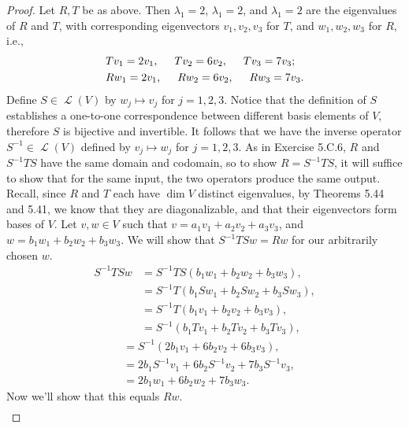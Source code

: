 \documentclass[letterpaper, 12pt]{amsart}
\DeclareMathOperator{\Ell}{\mathscr{L}}				%
\theoremstyle{definition}  							%
\begin{document}
		\begin{proof}
		Let $R,T$ be as above.
		Then $\lambda_{1} = 2$, $\lambda_{1} = 2$, and $\lambda_{1} = 2$ are the eigenvalues of $R$ and $T$, with corresponding eigenvectors $v_{1}, v_{2}, v_{3}$ for $T$, and $w_{1}, w_{2}, w_{3}$ for $R$, i.e.,
			\begin{align*}
				&Tv_{1} = 2v_{1}, \hspace{5mm} Tv_{2} = 6v_{2}, \hspace{5mm} Tv_{3} = 7v_{3}; \\
				&Rw_{1} = 2v_{1}, \hspace{5mm} Rw_{2} = 6v_{2}, \hspace{5mm} Rw_{3} = 7v_{3}.
			\end{align*}
		Define $S \in \Ell(V)$ by $w_{j} \mapsto v_{j}$ for $j = 1,2,3$.
		Notice that the definition of $S$ establishes a one-to-one correspondence between different basis elements of $V$, therefore $S$ is bijective and invertible.
		It follows that we have the inverse operator $S^{-1} \in \Ell(V)$ defined by $v_{j} \mapsto w_{j}$ for $j = 1,2,3$.
		As in Exercise 5.C.6, $R$ and $S^{-1}TS$ have the same domain and codomain, so to show $R = S^{-1}TS$, it will suffice to show that for the same input, the two operators produce the same output.
		Recall, since $R$ and $T$ each have $\dim V$ distinct eigenvalues, by Theorems 5.44 and 5.41, we know that they are diagonalizable, and that their eigenvectors form bases of $V$.
		Let $v,w \in V$ such that $v = a_{1}v_{1} + a_{2}v_{2} + a_{3}v_{3}$, and $w = b_{1}w_{1} + b_{2}w_{2} + b_{3}w_{3}$.
		We will show that $S^{-1}TSw = Rw$ for our arbitrarily chosen $w$.
			\begin{align*}
				S^{-1}TSw &= S^{-1}TS(b_{1}w_{1} + b_{2}w_{2} + b_{3}w_{3}), \\
				&= S^{-1} T(b_{1}Sw_{1} + b_{2}Sw_{2} + b_{3}Sw_{3}), \\
				&= S^{-1} T(b_{1}v_{1} + b_{2}v_{2} + b_{3}v_{3}), \\
				&= S^{-1}(b_{1}Tv_{1} + b_{2}Tv_{2} + b_{3}Tv_{3}),
			\end{align*}
			\begin{align*}
				&= S^{-1}(2b_{1}v_{1} + 6b_{2}v_{2} + 6b_{3}v_{3}), \\
				&= 2b_{1}S^{-1}v_{1} + 6b_{2}S^{-1}v_{2} + 7b_{3}S^{-1}v_{3}, \\
				&= 2b_{1}w_{1} + 6b_{2}w_{2} + 7b_{3}w_{3}.
			\end{align*}
		Now we'll show that this equals $Rw$.
			\begin{align*}

\end{align*}
\end{proof}
\end{document}
